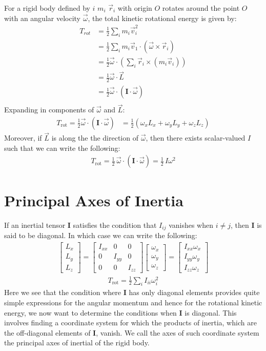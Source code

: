 \documentclass[11pt,oneside]{book}
\theoremstyle{break}
\theoremstyle{break}
\newcommand{\bmat}[1]{\begin{bmatrix}
#1
\end{bmatrix}}
\begin{document}
For a rigid body defined by $i$ $m_i$ $\vec{r}_i$ with origin $O$ rotates around the point $O$ with an angular velocity  $\vec{\omega}$, the total kinetic rotational energy is given by:
\begin{align*}
T_{rot}
&= \frac{1}{2}\sum_i m_i \vec{v}_i^2 \\
&= \frac{1}{2}\sum_i m_i \vec{v}_1 \cdot (\vec{\omega}\times \vec{r}_i) \\
&= \frac{1}{2}\vec{\omega} \cdot \left(\sum_i \vec{r}_i \times (m_i \vec{v}_i)\right)\\ 
&= \frac{1}{2}\vec{\omega}\cdot \vec{L} \\
&= \frac{1}{2}\vec{\omega} \cdot \left(\mathbf{I}\cdot \vec{\omega}\right) \\
\end{align*}
Expanding in components of $\vec{\omega}$ and $\vec{L}$:
\begin{align*}
T_{\text{rot}} =  \frac{1}{2}\vec{\omega} \cdot \left(\mathbf{I}\cdot \vec{\omega}\right) &= \frac{1}{2}(\omega_x L_x + \omega_y L_y + \omega_z L_z) 
\end{align*}
Moreover, if $\vec{L}$ is along the the direction of $\vec{\omega}$, then there exists scalar-valued $I$ such that we can write the following:
\begin{align*}
T_{\text{rot}} = \frac{1}{2}\,\vec{\omega}\cdot (\mathbf{ I} \cdot \vec{\omega}) = \frac{1}{2}\,I \omega^2
\end{align*}
\newpage
\section[Principal Axes of Inertia]{\color{red} Principal Axes of Inertia\color{black}}
If an inertial tensor $\mathbf{I}$ satisfies the condition that $I_{ij}$ vanishes when $i \neq j$, then $\mathbf{I}$ is said to be diagonal. In which case we can write the following:
\begin{align*}
\bmat{L_x \\ L_y \\L_z} = \bmat{I_{xx} & 0 & 0 \\
0 & I_{yy} & 0 \\
0 & 0 & I_{zz}} \bmat{\omega_x \\ \omega_y \\ \omega_z} = \bmat{I_{xx}\omega_x \\ I_{yy}\omega_y \\ I_{zz}\omega_z} \tag{PL}
\end{align*}
\begin{align*}
T_{\text{rot}} = \frac{1}{2}\sum_{i} I_{ii}\omega_i^2
\end{align*}
Here we see that the condition where $\mathbf{I}$ has only diagonal elements provides quite simple expressions for the angular momentum and hence for the rotational kinetic energy, we now want to determine the conditions when $\mathbf{I}$ is diagonal. This involves finding a coordinate system for which the products of inertia, which are the off-diagonal elements of $\mathbf{I}$, vanish. We call the axes of such coordinate system the principal axes of inertial of the rigid body.\\
\end{document}
